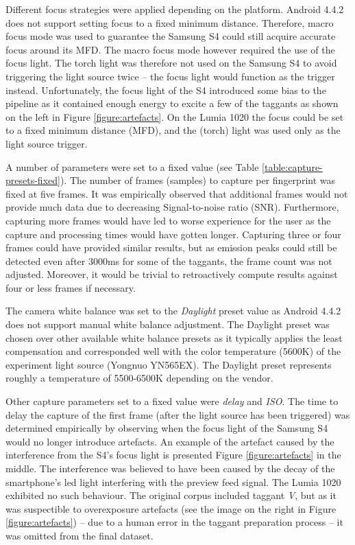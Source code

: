 \documentclass[thesis.tex]{subfiles}
\begin{document}
Different focus strategies were applied depending on the platform. Android 4.4.2 does not support setting focus to a fixed minimum distance. Therefore, macro focus mode was used to guarantee the Samsung S4 could still acquire accurate focus around its MFD. The macro focus mode however required the use of the focus light. The torch light was therefore not used on the Samsung S4 to avoid triggering the light source twice -- the focus light would function as the trigger instead. Unfortunately, the focus light of the S4 introduced some bias to the pipeline as it contained enough energy to excite a few of the taggants as shown on the left in Figure \ref{figure:artefacts}. On the Lumia 1020 the focus could be set to a fixed minimum distance (MFD), and the (torch) light was used only as the light source trigger.

A number of parameters were set to a fixed value (see Table \ref{table:capture-presets-fixed}). The number of frames (samples) to capture per fingerprint was fixed at five frames. It was empirically observed that additional frames would not provide much data due to decreasing Signal-to-noise ratio (SNR). Furthermore, capturing more frames would have led to worse experience for the user as the capture and processing times would have gotten longer. Capturing three or four frames could have provided similar results, but as emission peaks could still be detected even after 3000ms for some of the taggants, the frame count was not adjusted. Moreover, it would be trivial to retroactively compute results against four or less frames if necessary.

The camera white balance was set to the \emph{Daylight} preset value as Android 4.4.2 does not support manual white balance adjustment. The Daylight preset was chosen over other available white balance presets as it typically applies the least compensation and corresponded well with the color temperature (5600K) of the experiment light source (Yongnuo YN565EX). The Daylight preset represents roughly a temperature of 5500-6500K depending on the vendor.

Other capture parameters set to a fixed value were \emph{delay} and \emph{ISO}. The time to delay the capture of the first frame (after the light source has been triggered) was determined empirically by observing when the focus light of the Samsung S4 would no longer introduce artefacts. An example of the artefact caused by the interference from the S4's focus light is presented Figure \ref{figure:artefacts} in the middle. The interference was believed to have been caused by the decay of the smartphone's led light interfering with the preview feed signal. The Lumia 1020 exhibited no such behaviour. The original corpus included taggant \emph{V}, but as it was suspectible to overexposure artefacts (see the image on the right in Figure \ref{figure:artefacts}) -- due to a human error in the taggant preparation process -- it was omitted from the final dataset.
\end{document}
